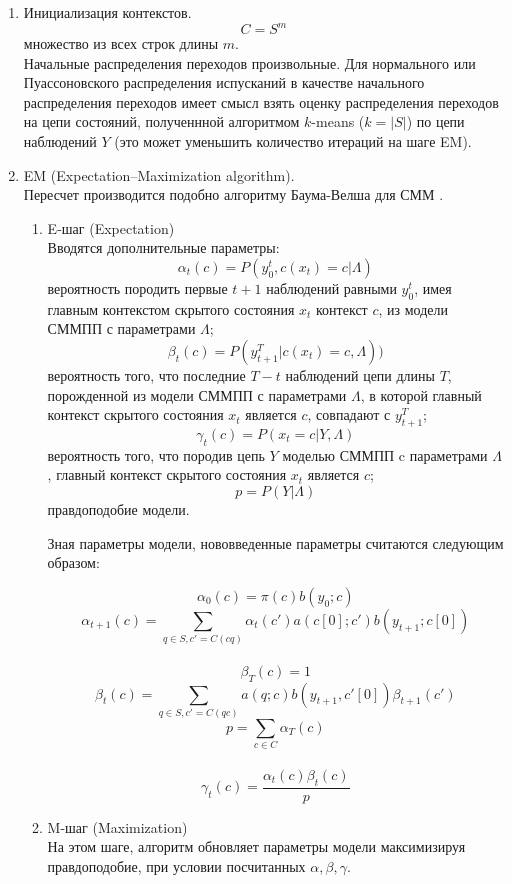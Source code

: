 \documentclass{matmex-diploma-custom}
\begin{document}
\begin{enumerate}
\item Инициализация контекстов.
$$ C = S^{m}$$
множество из всех строк длины $m$.
\\
Начальные распределения переходов произвольные.
Для нормального или Пуассоновского распределения испусканий в качестве начального распределения переходов имеет смысл взять оценку распределения переходов на цепи состояний, полученнной алгоритмом $k$-means ($k=|S|$) по цепи наблюдений $Y$ (это может уменьшить количество итераций на шаге EM).
\\
\item EM (Expectation–Maximization algorithm).
\\
Пересчет производится подобно алгоритму Баума-Велша для СММ \cite{Rabiner1989}.
\\
\begin{enumerate}
\item E-шаг (Expectation)\\
Вводятся дополнительные параметры:
$$ \alpha_{t}(c) = P(y_{0}^{t}, c(x_{t})=c| \Lambda)$$
вероятность породить первые $t+1$ наблюдений равными $y_{0}^{t}$, имея главным контекстом  скрытого состояния $x_{t}$ контекст $ c $, из модели СММПП с параметрами $\Lambda$;
$$ \beta_{t}(c) = P(y_{t+1}^{T}| c(x_{t})=c, \Lambda))$$
вероятность того, что последние $T-t$ наблюдений цепи длины $T$, порожденной из модели СММПП с параметрами $\Lambda$, в которой главный контекст скрытого состояния $x_{t}$ является $ c $, совпадают с $y_{t+1}^{T}$;
$$ \gamma_{t}(c) = P(x_{t}=c|Y,\Lambda) $$ 
вероятность того, что породив цепь $Y$ моделью СММПП c параметрами $\Lambda$,
главный контекст скрытого состояния $ x_{t} $ является $c$;
$$p = P(Y|\Lambda)$$
правдоподобие модели. 

Зная параметры модели, нововведенные параметры считаются следующим образом:
\begin{center}
$$ \alpha_{0}(c) = \pi(c)b(y_{0}; c)$$ 
$$ \alpha_{t+1}(c) = \sum_{q \in S, c'=C(cq)}{\alpha_{t}(c')a(c[0];c')b(y_{t+1}; c[0])}$$
\\
$$ \beta_{T}(c) = 1$$ 
$$ \beta_{t}(c) = \sum_{q \in S, c'=C(qc)}{a(q;c)b(y_{t+1}, c'[0])\beta_{t+1}(c')}$$
$$p = \sum_{c \in C}\alpha_{T}(c)$$
\\ 
$$ \gamma_{t}(c) = \frac{\alpha_{t}(c)\beta_{t}(c)}{p}$$
\end{center}
\item M-шаг (Maximization)\\
На этом шаге, алгоритм обновляет параметры модели максимизируя правдоподобие, при условии посчитанных $\alpha, \beta, \gamma$.


\end{enumerate}
\end{enumerate}
\end{document}
